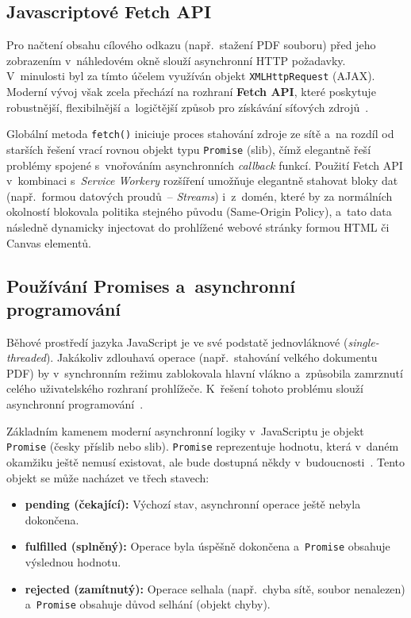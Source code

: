 \documentclass[a4paper,12pt]{article}
\begin{document}
\subsection{Javascriptové Fetch API}
\label{subsec:teorie_fetch}

Pro načtení obsahu cílového odkazu (např.~stažení PDF souboru) před jeho zobrazením v~náhledovém okně slouží asynchronní HTTP požadavky. V~minulosti byl za tímto účelem využíván objekt \texttt{XMLHttpRequest} (AJAX). Moderní vývoj však zcela přechází na rozhraní \textbf{Fetch API}, které poskytuje robustnější, flexibilnější a~logičtější způsob pro získávání síťových zdrojů~\autocite{flanagan2020}.

Globální metoda \texttt{fetch()} iniciuje proces stahování zdroje ze sítě a~na rozdíl od starších řešení vrací rovnou objekt typu \texttt{Promise} (slib), čímž elegantně řeší problémy spojené s~vnořováním asynchronních \textit{callback} funkcí. Použití Fetch API v~kombinaci s~\textit{Service Workery} rozšíření umožňuje elegantně stahovat bloky dat (např.~formou datových proudů~-- \textit{Streams}) i~z~domén, které by za normálních okolností blokovala politika stejného původu (Same-Origin Policy), a~tato data následně dynamicky injectovat do prohlížené webové stránky formou HTML či Canvas elementů.

\subsection{Používání Promises a~asynchronní programování}
\label{subsec:teorie_promises}

Běhové prostředí jazyka JavaScript je ve své podstatě jednovláknové (\textit{single-threaded}). Jakákoliv zdlouhavá operace (např.~stahování velkého dokumentu PDF) by v~synchronním režimu zablokovala hlavní vlákno a~způsobila zamrznutí celého uživatelského rozhraní prohlížeče. K~řešení tohoto problému slouží asynchronní programování~\autocite{flanagan2020}.

Základním kamenem moderní asynchronní logiky v~JavaScriptu je objekt \texttt{Promise} (česky příslib nebo slib). \texttt{Promise} reprezentuje hodnotu, která v~daném okamžiku ještě nemusí existovat, ale bude dostupná někdy v~budoucnosti~\autocite{mdn_promises}. Tento objekt se může nacházet ve třech stavech:
\begin{itemize}
    \item \textbf{pending (čekající):} Výchozí stav, asynchronní operace ještě nebyla dokončena.
    \item \textbf{fulfilled (splněný):} Operace byla úspěšně dokončena a~\texttt{Promise} obsahuje výslednou hodnotu.
    \item \textbf{rejected (zamítnutý):} Operace selhala (např.~chyba sítě, soubor nenalezen) a~\texttt{Promise} obsahuje důvod selhání (objekt chyby).
\end{itemize}
\end{document}
